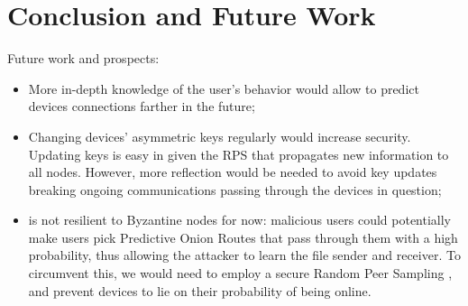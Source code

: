 \section{Conclusion and Future Work}

 Future work and prospects:
\begin{itemize}
	\item More in-depth knowledge of the user's behavior would allow to predict devices connections farther in the future;
	\item Changing devices' asymmetric keys regularly would increase security.
	Updating keys is easy in \name given the RPS that propagates new information to all nodes.
	However, more reflection would be needed to avoid key updates breaking ongoing communications passing through the devices in question;
	\item \name is not resilient to Byzantine nodes for now: malicious users could potentially make users pick Predictive Onion Routes that pass through them with a high probability, thus allowing the attacker to learn the file sender and receiver. To circumvent this, we would need to employ a secure Random Peer Sampling \cite{Jesi_Montresor_van_Steen_2010}, and prevent devices to lie on their probability of being online.

\end{itemize}